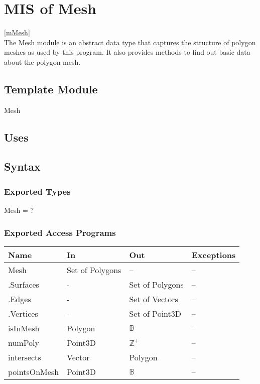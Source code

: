 \documentclass[12pt, titlepage]{article}
\begin{document}
\newpage


\section{MIS of Mesh} \ref{mMesh} \\
The Mesh module is an abstract data type that captures the structure of polygon 
meshes as used by this program. It also provides methods to find out basic data 
about the polygon mesh.

\subsection{Template Module}
Mesh

\subsection{Uses}

\subsection{Syntax}
\subsubsection{Exported Types}
Mesh = ?

\subsubsection{Exported Access Programs}
\begin{center}
	\begin{tabular}{p{2cm} p{4cm} p{4cm} p{2cm}}
		\hline
		\textbf{Name} & \textbf{In} & \textbf{Out} & \textbf{Exceptions} \\
		\hline
		Mesh & Set of Polygons & -- & -- \\
		.Surfaces & - & Set of Polygons & -- \\
		.Edges & - & Set of Vectors & -- \\
		.Vertices & - & Set of Point3D & -- \\
		isInMesh & Polygon & $\mathbb{B}$ & -- \\ %
		numPoly & Point3D & $\mathbb{Z^+}$ & -- \\ %
		intersects & Vector & Polygon & -- \\ %
		pointsOnMesh & Point3D & $\mathbb{B}$ & -- \\
		\hline
	\end{tabular}
\end{center}
\end{document}
